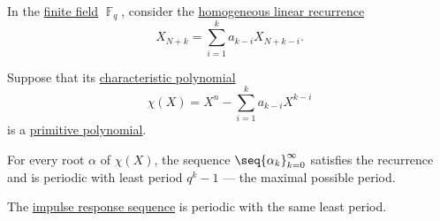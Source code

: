 \begin{theorem}\label{thm:linear_recurrences_with_maximal_period}
  In the \hyperref[def:finite_field]{finite field} \( \BbbF_q \), consider the \hyperref[def:homogeneous_linear_recurrence]{homogeneous linear recurrence}
  \begin{equation*}
    X_{N+k} = \sum_{i=1}^k a_{k-i} X_{N+k-i}.
  \end{equation*}

  Suppose that its \hyperref[def:linear_recurrence_characteristic_polynomial]{characteristic polynomial}
  \begin{equation*}
    \chi(X) = X^n - \sum_{i=1}^k a_{k-i} X^{k-i}
  \end{equation*}
  is a \hyperref[def:finite_field_primitive_polynomial]{primitive polynomial}.

  \begin{thmenum}
     For every root \( \alpha \) of \( \chi(X) \), the sequence \( \seq{ \alpha_k }_{k=0}^\infty \) satisfies the recurrence and is periodic with least period \( q^k - 1 \) --- the maximal possible period.

     The \hyperref[def:recurrence_relation_space]{impulse response sequence} is periodic with the same least period.
  \end{thmenum}
\end{theorem}
